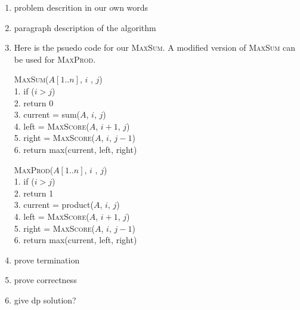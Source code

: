 \documentclass{article}
\begin{document}
\begin{enumerate}
    \item problem descrition in our own words
    \item paragraph description of the algorithm
    \item Here is the psuedo code for our \textsc{MaxSum}.
        A modified version of \textsc{MaxSum} can be used for \textsc{MaxProd}.
        \begin{algorithm}
            \textsc{MaxSum}($A[1..n]$, $i$ , $j$) \\
            1. \hspace{1em} if ($i > j$) \\
            2. \hspace{2em}     return 0 \\
            3. \hspace{1em} current = sum($A$, $i$, $j$) \\
            4. \hspace{1em} left = \textsc{MaxScore}($A$, $i+1$, $j$) \\
            5. \hspace{1em} right = \textsc{MaxScore}($A$, $i$, $j-1$) \\
            6. \hspace{1em} return max(current, left, right)
        \end{algorithm}
        \begin{algorithm}
            \textsc{MaxProd}($A[1..n]$, $i$ , $j$) \\
            1. \hspace{1em} if ($i > j$) \\
            2. \hspace{2em}     return 1 \\
            3. \hspace{1em} current = product($A$, $i$, $j$) \\
            4. \hspace{1em} left = \textsc{MaxScore}($A$, $i+1$, $j$) \\
            5. \hspace{1em} right = \textsc{MaxScore}($A$, $i$, $j-1$) \\
            6. \hspace{1em} return max(current, left, right)
        \end{algorithm}
    \item prove termination
    \item prove correctness
    \item give dp solution?
\end{enumerate}
\end{document}
